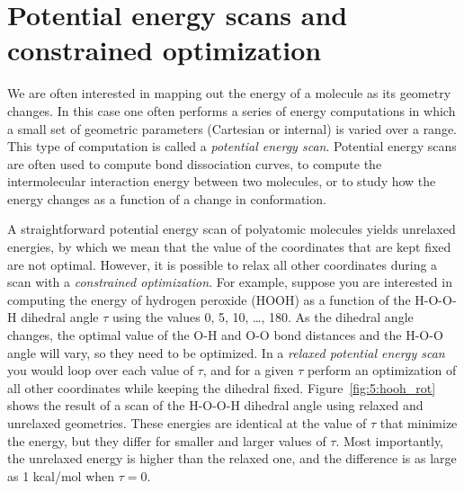 \documentclass[../Main/chem371-notes.tex]{subfiles}
\begin{document}
\section{Potential energy scans and constrained optimization}

We are often interested in mapping out the energy of a molecule as its geometry changes.
In this case one often performs a series of energy computations in which a small set of geometric parameters (Cartesian or internal) is varied over a range.
This type of computation is called a \emph{potential energy scan}.
Potential energy scans are often used to compute bond dissociation curves, to compute the intermolecular interaction energy between two molecules, or to study how the energy changes as a function of a change in conformation.

A straightforward potential energy scan of polyatomic molecules yields unrelaxed energies, by which we mean that the value of the coordinates that are kept fixed are not optimal.
However, it is possible to relax all other coordinates during a scan with a \emph{constrained optimization}.
For example, suppose you are interested in computing the energy of hydrogen peroxide (HOOH) as a function of the H-O-O-H dihedral angle $\tau$ using the values 0, 5, 10, \ldots, 180\textdegree.
As the dihedral angle changes, the optimal value of the O-H and O-O bond distances and the H-O-O angle will vary, so they need to be optimized.
In a \emph{relaxed potential energy scan} you would loop over each value of $\tau$, and for a given $\tau$  perform an optimization of all other coordinates while keeping the dihedral fixed.
Figure~\ref{fig:5:hooh_rot} shows the result of a scan of the H-O-O-H dihedral angle using relaxed and unrelaxed geometries.
These energies are identical at the value of $\tau$ that minimize the energy, but they differ for smaller and larger values of $\tau$.
Most importantly, the unrelaxed energy is higher than the relaxed one, and the difference is as large as 1 kcal/mol when $\tau = 0$. 

\end{document}
